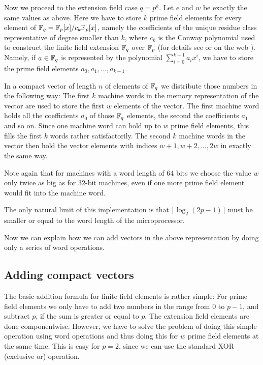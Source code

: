 Now we proceed to the extension field case $q=p^k$. Let $e$ and $w$ be
exactly the same values as above. Here we have to store $k$ prime field
elements for every element of $\mathbb{F}_q = \mathbb{F}_p[x]/c_k\mathbb{F}_p[x]$, namely the 
coefficients of the unique residue class representative of degree smaller 
than $k$, where $c_k$ is the Conway polynomial used to construct the 
%
finite field extension $\mathbb{F}_q$ over $\mathbb{F}_p$ (for details see \cite{Nickel}
or on the web \cite{ConwayFL}). Namely, if $a \in \mathbb{F}_q$ is represented by
the polynomial $\sum_{i=0}^{k-1} a_i x^i$, we have to store the prime 
field elements $a_0, a_1, \ldots, a_{k-1}$. 

In a compact vector of length $n$ of elements of $\mathbb{F}_q$ we distribute
those numbers in the following way: The first $k$ machine words in the
memory representation of the vector are used to store the first $w$
elements of the vector. The first machine word holds all the coefficients
$a_0$ of those $\mathbb{F}_q$ elements, the second the coefficients $a_1$ and so
on. Since one machine word can hold up to $w$ prime field elements, this
fills the first $k$ words rather satisfactorily. The second $k$ machine words
in the vector then hold the vector elements with indices 
$w+1, w+2, \ldots, 2w$ in exactly the same way.

Note again that for machines with a word length of $64$ bits we choose the
value $w$ only twice as big as for $32$-bit machines, even if one more
prime field element would fit into the machine word.

The only natural limit of this implementation is that 
$\lceil \log_2(2p-1) \rceil$ must be smaller or equal to the word length
of the microprocessor.

Now we can explain how we can add vectors in the above representation
by doing only a series of word operations.

\subsection{Adding compact vectors}

The basic addition formula for finite field elements is rather simple:
For prime field elements we only have to add two numbers in the range 
from $0$ to $p-1$, and
subtract $p$, if the sum is greater or equal to $p$. The extension
field elements are done componentwise. However, we have to solve
the problem of doing this simple operation using word operations and 
thus doing this for $w$ prime field elements at the same time.
This is easy for $p=2$, since we can use the standard XOR (exclusive or)
operation.

